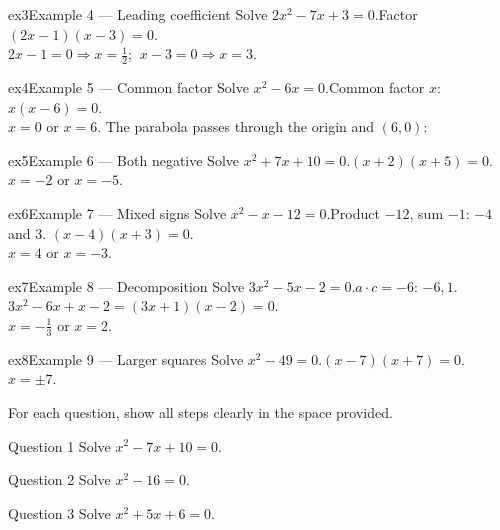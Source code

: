 \documentclass[11pt]{article}
\begin{document}
\begin{example}{ex3}{Example 4 --- Leading coefficient}
Solve $2x^2-7x+3=0$.\soln Factor $(2x-1)(x-3)=0$. \\ $2x-1=0\Rightarrow x=\tfrac12$; $\ x-3=0\Rightarrow x=3$.
\end{example}

\begin{example}{ex4}{Example 5 --- Common factor}
Solve $x^2-6x=0$.\soln Common factor $x$: $x(x-6)=0$. \\ $x=0$ or $x=6$. The parabola passes through the origin and $(6,0)$:
\end{example}

\begin{example}{ex5}{Example 6 --- Both negative}
Solve $x^2+7x+10=0$.\soln $(x+2)(x+5)=0$. \\ $x=-2$ or $x=-5$.
\end{example}

\begin{example}{ex6}{Example 7 --- Mixed signs}
Solve $x^2-x-12=0$.\soln Product $-12$, sum $-1$: $-4$ and $3$. $(x-4)(x+3)=0$. \\ $x=4$ or $x=-3$.
\end{example}

\begin{example}{ex7}{Example 8 --- Decomposition}
Solve $3x^2-5x-2=0$.\soln $a\cdot c=-6$: $-6,1$. $3x^2-6x+x-2=(3x+1)(x-2)=0$. \\ $x=-\tfrac13$ or $x=2$.
\end{example}

\begin{example}{ex8}{Example 9 --- Larger squares}
Solve $x^2-49=0$.\soln $(x-7)(x+7)=0$. \\ $x=\pm7$.
\end{example}

\clearpage
{}
For each question, show all steps clearly in the space provided.

\begin{qbox}{Question 1}
Solve $x^2-7x+10=0$.\workspace{2.4cm}
\end{qbox}

\begin{qbox}{Question 2}
Solve $x^2-16=0$.\workspace{2.4cm}
\end{qbox}

\begin{qbox}{Question 3}
Solve $x^2+5x+6=0$.\workspace{2.4cm}
\end{qbox}
\end{document}
